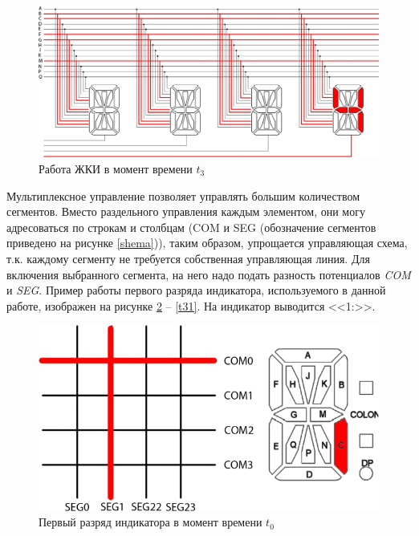 \begin{figure}[H]
\begin{center}
\includegraphics[scale=0.28]{Image/31.jpg} 
\end{center}
\caption{Работа ЖКИ в момент времени $t_3$}\label{t3}
\end{figure}

Мультиплексное управление позволяет управлять большим количеством сегментов. Вместо раздельного управления каждым элементом, они могу адресоваться по строкам и столбцам (COM и SEG (обозначение сегментов приведено на рисунке \ref{shema})), таким образом, упрощается управляющая схема, т.к. каждому сегменту не требуется собственная управляющая линия. Для включения выбранного сегмента, на него надо подать разность потенциалов \textit{COM} и \textit{SEG}. Пример работы первого разряда индикатора, используемого в данной работе, изображен на рисунке \ref{t01} -- \ref{t31}. На индикатор выводится <<1:>>.

\begin{figure}[H]
\begin{center}
\includegraphics[scale=0.4]{Image/32.jpg} 
\end{center}
\caption{Первый разряд индикатора в момент времени $t_0$}\label{t01}
\end{figure}


